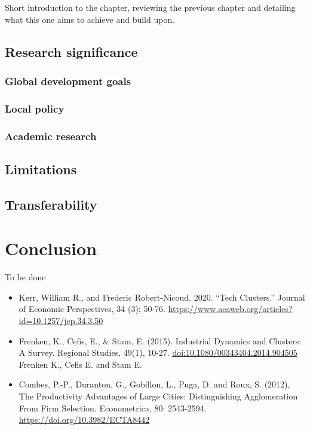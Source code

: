 \documentclass[
  12pt,
  oneside]{book}
\begin{document}
Short introduction to the chapter, reviewing the previous chapter and detailing what this one aims to achieve and build upon.

\hypertarget{research-significance}{%
\section{Research significance}\label{research-significance}}

\hypertarget{global-development-goals}{%
\subsection{Global development goals}\label{global-development-goals}}

\hypertarget{local-policy}{%
\subsection{Local policy}\label{local-policy}}

\hypertarget{academic-research}{%
\subsection{Academic research}\label{academic-research}}

\hypertarget{limitations-1}{%
\section{Limitations}\label{limitations-1}}

\hypertarget{transferability}{%
\section{Transferability}\label{transferability}}

\hypertarget{conclusion}{%
\chapter{Conclusion}\label{conclusion}}

To be done

\begin{itemize}
\item
  Kerr, William R., and Frederic Robert-Nicoud. 2020. ``Tech Clusters.'' Journal of Economic Perspectives, 34 (3): 50-76. \url{https://www.aeaweb.org/articles?id=10.1257/jep.34.3.50}
\item
  Frenken, K., Cefis, E., \& Stam, E. (2015). Industrial Dynamics and Clusters: A Survey. Regional Studies, 49(1), 10-27. \url{doi:10.1080/00343404.2014.904505}
  Frenken K., Cefis E. and Stam E.
\item
  Combes, P.-P., Duranton, G., Gobillon, L., Puga, D. and Roux, S. (2012), The Productivity Advantages of Large Cities: Distinguishing Agglomeration From Firm Selection. Econometrica, 80: 2543-2594. \url{https://doi.org/10.3982/ECTA8442}
\end{itemize}
\end{document}
